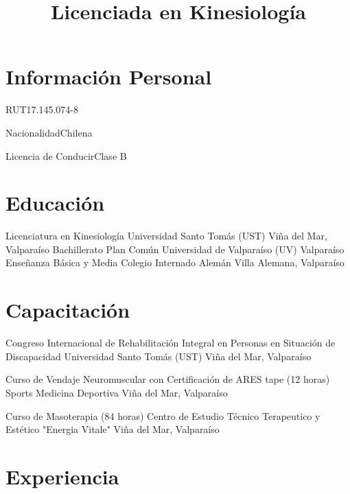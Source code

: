 \documentclass[11pt,a4paper,sans]{moderncv}
\title{Licenciada en Kinesiología}
\begin{document}
\maketitle

\section{Información Personal}

	   {RUT}{17.145.074-8}

	   {Nacionalidad}{Chilena}

	   {Licencia de Conducir}{Clase B}
	   
\section{Educación}

        {Licenciatura en Kinesiología}
        {Universidad Santo Tomás (UST)}
        {Viña del Mar, Valparaíso}
        {}
        {}
        {Bachillerato Plan Común}
        {Universidad de Valparaíso (UV)}
        {Valparaíso}
        {}
        {}
        {Enseñanza Básica y Media}
        {Colegio Internado Alemán}
        {Villa Alemana, Valparaíso}
        {}{}
        
\section{Capacitación}

        {Congreso Internacional de Rehabilitación Integral en Personas en Situación de Discapacidad}
        {Universidad Santo Tomás (UST)}
        {Viña del Mar, Valparaíso}
        {}
        {}

        {Curso de Vendaje Neuromuscular con Certificación de ARES tape (12 horas)}
        {Sports Medicina Deportiva}
        {Viña del Mar, Valparaíso}
        {}
        {}

        {Curso de Masoterapia (84 horas)}
        {Centro de Estudio Técnico Terapeutico y Estético "Energia Vitale"}
        {Viña del Mar, Valparaíso}
        {}
        {}

\section{Experiencia}
\end{document}
